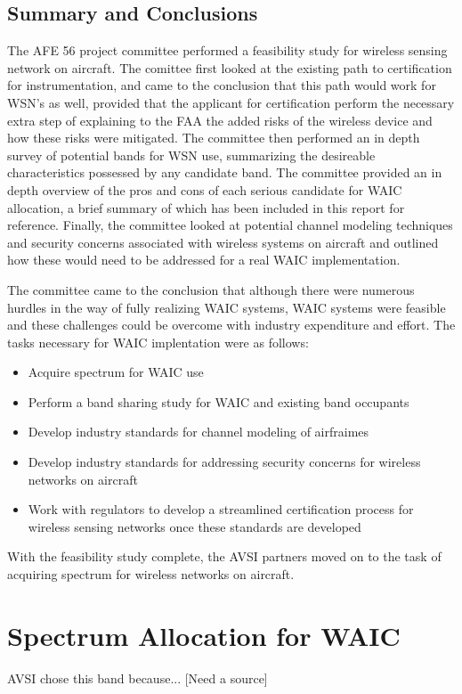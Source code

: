\subsection{Summary and Conclusions}
The AFE 56 project committee performed a feasibility study for wireless sensing network on aircraft. The comittee first looked at the existing path to certification for instrumentation, and came to the conclusion that this path would work for WSN's as well, provided that the applicant for certification perform the necessary extra step of explaining to the FAA the added risks of the wireless device and how these risks were mitigated. The committee then performed an in depth survey of potential bands for WSN use, summarizing the desireable characteristics possessed by any candidate band. The committee provided an in depth overview of the pros and cons of each serious candidate for WAIC allocation, a brief summary of which has been included in this report for reference. Finally, the  committee looked at potential channel modeling techniques and security concerns associated with wireless systems on aircraft and outlined how these would need to be addressed for a real WAIC implementation. 

The committee came to the conclusion that although there were numerous hurdles in the way of fully realizing WAIC systems, WAIC systems were feasible and these challenges could be overcome with industry expenditure and effort. The tasks necessary for WAIC implentation were as follows: 
\begin{itemize}
\item Acquire spectrum for WAIC use
\item Perform a band sharing study for WAIC and existing band occupants
\item Develop industry standards for channel modeling of airfraimes
\item Develop industry standards for addressing security concerns for wireless networks on aircraft
\item Work with regulators to develop a streamlined certification process for wireless sensing networks once these standards are developed
\end{itemize}
 
 With the feasibility study complete, the AVSI partners moved on to the task of acquiring spectrum for wireless networks on aircraft. 
 
\section{Spectrum Allocation for WAIC}
AVSI chose this band because... [Need a source]

